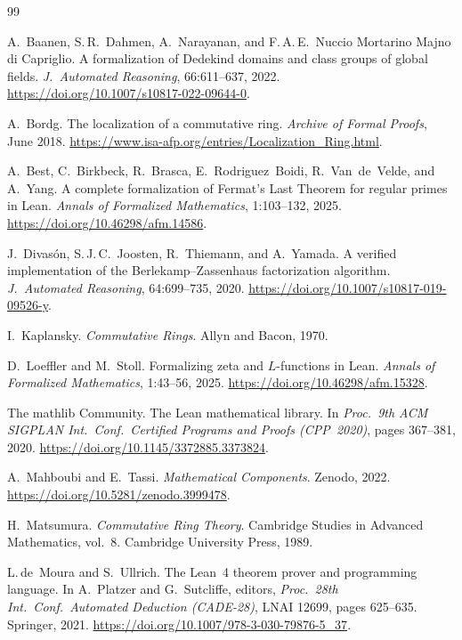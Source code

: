 \documentclass[11pt]{article}
\theoremstyle{plain}
\theoremstyle{definition}
\theoremstyle{remark}
\newcommand{\doi}[1]{\url{https://doi.org/#1}}
\begin{document}
\begin{thebibliography}{99}

A.~Baanen, S.\,R.~Dahmen, A.~Narayanan, and
  F.\,A.\,E.~Nuccio Mortarino Majno di Capriglio.
\newblock A formalization of {D}edekind domains and class groups of global
  fields.
\newblock \emph{J.~Automated Reasoning}, 66:611--637, 2022.
\newblock \doi{10.1007/s10817-022-09644-0}.

A.~Bordg.
\newblock The localization of a commutative ring.
\newblock \emph{Archive of Formal Proofs}, June 2018.
\newblock \url{https://www.isa-afp.org/entries/Localization_Ring.html}.

A.~Best, C.~Birkbeck, R.~Brasca, E.~Rodriguez~Boidi, R.~Van~de~Velde,
  and A.~Yang.
\newblock A complete formalization of {F}ermat's {L}ast {T}heorem for regular
  primes in {L}ean.
\newblock \emph{Annals of Formalized Mathematics}, 1:103--132, 2025.
\newblock \doi{10.46298/afm.14586}.

J.~Divas{\'o}n, S.\,J.\,C.~Joosten, R.~Thiemann, and A.~Yamada.
\newblock A verified implementation of the {B}erlekamp--{Z}assenhaus
  factorization algorithm.
\newblock \emph{J.~Automated Reasoning}, 64:699--735, 2020.
\newblock \doi{10.1007/s10817-019-09526-y}.

I.~Kaplansky.
\newblock \emph{Commutative Rings}.
\newblock Allyn and Bacon, 1970.

D.~Loeffler and M.~Stoll.
\newblock Formalizing zeta and {$L$}-functions in {L}ean.
\newblock \emph{Annals of Formalized Mathematics}, 1:43--56, 2025.
\newblock \doi{10.46298/afm.15328}.

The mathlib Community.
\newblock The {L}ean mathematical library.
\newblock In \emph{Proc.\ 9th ACM SIGPLAN Int.\ Conf.\ Certified Programs and
  Proofs (CPP~2020)}, pages 367--381, 2020.
\newblock \doi{10.1145/3372885.3373824}.

A.~Mahboubi and E.~Tassi.
\newblock \emph{Mathematical Components}.
\newblock Zenodo, 2022.
\newblock \doi{10.5281/zenodo.3999478}.

H.~Matsumura.
\newblock \emph{Commutative Ring Theory}.
\newblock Cambridge Studies in Advanced Mathematics, vol.~8. Cambridge
  University Press, 1989.

L.\,de~Moura and S.~Ullrich.
\newblock The {L}ean~4 theorem prover and programming language.
\newblock In A.~Platzer and G.~Sutcliffe, editors, \emph{Proc.\ 28th Int.\
  Conf.\ Automated Deduction (CADE-28)}, LNAI 12699, pages 625--635.
  Springer, 2021.
\newblock \doi{10.1007/978-3-030-79876-5_37}.


\end{thebibliography}
\end{document}
